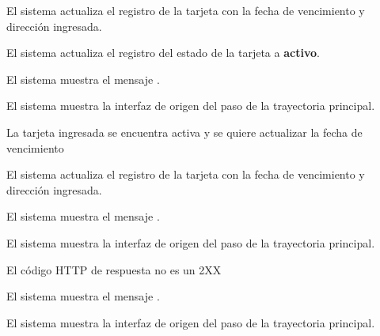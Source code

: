 {\begin{trayectoriaAlternativa}
    \item El sistema actualiza el registro de la tarjeta con la fecha de
      vencimiento y dirección ingresada.

    \item El sistema actualiza el registro del estado de la tarjeta a
      \textbf{activo}.

    \item El sistema muestra el mensaje
      .

    \item El sistema muestra la interfaz de origen del paso
       de la trayectoria principal.

  \end{trayectoriaAlternativa}


  \begin{trayectoriaAlternativa}
    {La tarjeta ingresada se encuentra activa y se quiere actualizar la fecha
    de vencimiento}

    \item El sistema actualiza el registro de la tarjeta con la fecha de
      vencimiento y dirección ingresada.

      \item El sistema muestra el mensaje
      .

    \item El sistema muestra la interfaz de origen del paso
       de la trayectoria principal.

  \end{trayectoriaAlternativa}


  \begin{trayectoriaAlternativa}
    {El código HTTP de respuesta no es un 2XX}

    \item El sistema muestra el mensaje
      .

    \item El sistema muestra la interfaz de origen del paso
       de la trayectoria principal.

  \end{trayectoriaAlternativa}
}

